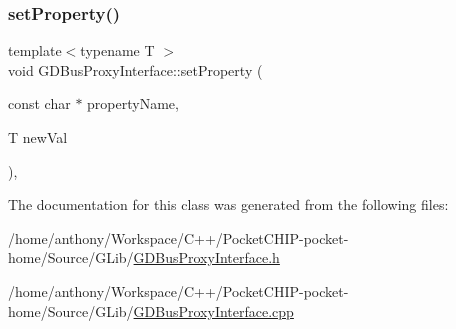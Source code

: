\mbox{\label{classGDBusProxyInterface_a7153d71bbda4ba30f3100d02684ba279}} 
\subsubsection{\texorpdfstring{set\+Property()}{setProperty()}}
{\footnotesize\ttfamily template$<$typename T $>$ \\
void G\+D\+Bus\+Proxy\+Interface\+::set\+Property (\begin{DoxyParamCaption}\item[{const char $\ast$}]{property\+Name,  }\item[{T}]{new\+Val }\end{DoxyParamCaption})\hspace{0.3cm}{\ttfamily [inline]}, {\ttfamily [protected]}}



The documentation for this class was generated from the following files\+:\begin{DoxyCompactItemize}
\item 
/home/anthony/\+Workspace/\+C++/\+Pocket\+C\+H\+I\+P-\/pocket-\/home/\+Source/\+G\+Lib/\mbox{\hyperlink{GDBusProxyInterface_8h}{G\+D\+Bus\+Proxy\+Interface.\+h}}\item 
/home/anthony/\+Workspace/\+C++/\+Pocket\+C\+H\+I\+P-\/pocket-\/home/\+Source/\+G\+Lib/\mbox{\hyperlink{GDBusProxyInterface_8cpp}{G\+D\+Bus\+Proxy\+Interface.\+cpp}}\end{DoxyCompactItemize}
